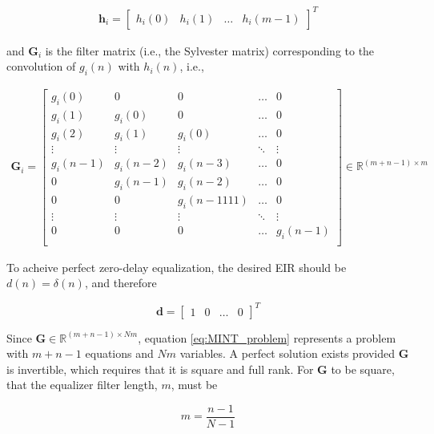\begin{eqnarray}
	\boldsymbol{h}_i = 
		\begin{bmatrix}
			h_i(0) & h_i(1) & \dots & h_i(m-1)
		\end{bmatrix}^T
\end{eqnarray}

\noindent
and $\boldsymbol{G}_i$ is the filter matrix (i.e., the Sylvester matrix) corresponding to the convolution of $g_i(n)$ with $h_i(n)$, i.e.,

\begin{eqnarray}
	\boldsymbol{G}_i = 
	\begin{bmatrix} 
		g_i(0)     & 0           & 0              & \dots    & 0  \\
		g_i(1)     & g_i(0)    & 0              & \dots    & 0  \\
		g_i(2)    & g_i(1)     & g_i(0)      & \dots    & 0  \\
		\vdots    & \vdots    & \vdots     & \ddots & \vdots  \\
		g_i(n-1) & g_i(n-2) & g_i(n-3) & \dots   & 0 \\
		0            & g_i(n-1)  & g_i(n-2) & \dots   & 0 \\
		0            & 0             & g_i(n-1
		111) & \dots   & 0 \\
		\vdots    & \vdots    & \vdots     & \ddots & \vdots  \\
		0            & 0             & 0             & \dots   & g_i(n-1) \\
	\end{bmatrix} 
	\in \mathbb{R}^{(m+n-1)\times m}
\end{eqnarray}

\noindent
To acheive perfect zero-delay equalization, the desired EIR should be $d(n)=\delta(n)$, and therefore

\begin{equation}
	\boldsymbol{d} =
		\begin{bmatrix}
			1 & 0 & \dots & 0
		\end{bmatrix}^T
\end{equation}

Since $\boldsymbol{G} \in \mathbb{R}^{(m+n-1)\times Nm}$, equation \ref{eq:MINT_problem} represents a problem with $m+n-1$ equations and $Nm$ variables. A perfect solution exists provided $\boldsymbol{G}$ is invertible, which requires that it is square and full rank. For $\boldsymbol{G}$ to be square, that the equalizer filter length, $m$, must be

\begin{equation}
	m = \frac{n-1}{N-1}
\end{equation}

